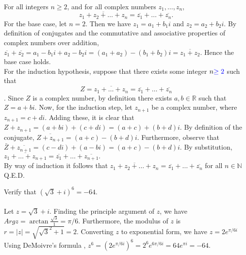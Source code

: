 \documentclass{article}
\theoremstyle{definition}
\newcommand{\R}{\mathbb{R}}
\newcommand{\N}{\mathbb{N}}
\newcommand{\cs}[1]{\color{blue}{#1}\normalcolor}
\begin{document}
\\
 For all integers $n\ge 2$, and for all complex numbers $z_1,\dots,z_n$, 
$$\overline{z_1+z_2+\dots+z_n} = \overline{z_1} + \dots + \overline{z_n}.$$
 For the base case, let $n = 2$. Then we have $z_1 = a_1+b_1i$ and $z_2 = a_2+b_2 i$. By definition of conjugates and the commutative and associative properties of complex numbers over addition, $\overline{z_1}+\overline{z_2} = a_1 -b_1 i + a_2 - b_2 i = (a_1+a_2) - (b_1+b_2)i = \overline{z_1+z_2}.$ Hence the base case holds.\\
For the induction hypothesis, suppose that there exists some integer $n\cs{\ge 2}$ such that 
$$ Z = \overline{z_1+\dots+z_n} = \overline{z_1} + \dots + \overline{z_n}$$ \cs{for any $n$ complex numbers $z_1, \ldots, z_n$}.
Since $Z$ is a complex number, by definition there exists $a,b\in \R$ such that $Z = a+bi$. Now, for the induction step, let $z_{n+1}$ be a complex number, where $z_{n+1} = c+di$. Adding these, it is clear that $Z + z_{n+1} = (a+bi) + (c+di) = (a+c)+(b+d)i$. By definition of the conjugate, $\overline{Z+z_{n+1}} = (a+c)-(b+d)i.$ Furthermore, observe that $\bar{Z} + \overline{z_{n+1}} = (c-di) + (a-bi) = (a+c)-(b+d)i.$ \cs{Or you could call on the base case since there are only two terms here.} By substitution, $\overline{z_1+\dots+z_{n+1}} = \overline{z_1}+\dots+\overline{z_{n+1}}.$\\
By way of induction it follows that $\overline{z_1+z_2+\dots+z_n} = \overline{z_1} + \dots + \overline{z_n}$ for all $n\in \N$
\\
Q.E.D.

\cs{Great! 5/5}

\cs{15/15}

\vspace{0.5cm}


 Verify that $(\sqrt{3}+i)^6 = -64$.\\
\\ Let $z = \sqrt{3} + i$. Finding the principle argument of $z$, we have $Argz =  \arctan{\frac{\sqrt{3}}{1}} = \pi/6$. \cs{$\arctan \sqrt{3}=\pi/3.$ But you need $\arctan(1/\sqrt{3}),$ which is $\pi/6.$} Furthermore, the modulus of $z$ is $r = |z| = \sqrt{\sqrt{3}^2+ 1} = 2.$ Converting $z$ to exponential form, we have $z = 2e^{\pi/6i}$ Using DeMoivre's formula \cs{You're actually bypassing it by just sticking with the exponential form (which is dandy!).}, $z^6 = (2e^{\pi/6i})^6 = 2^6e^{6\pi/6i} = 64e^{\pi i} = -64.$\\
\end{document}
